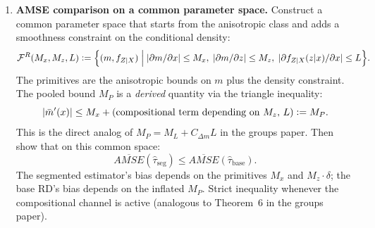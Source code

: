 \begin{itemize}
\begin{enumerate}
\begin{equation*}
			\min_{\hat\tau \in \mathcal{L}} \sup_{f \in \mathcal{F}_{\mathrm{aniso}}(M, M)} \mathrm{MSE}(\hat\tau, f) < \min_{\hat\tau \in \mathcal{L}} \sup_{f \in \mathcal{F}_{\mathrm{iso}}(M\sqrt{2})} \mathrm{MSE}(\hat\tau, f).
		\end{equation*}
		The weak inequality is mechanical from $\mathcal{F}_{\mathrm{aniso}}(M,M) \subset \mathcal{F}_{\mathrm{iso}}(M\sqrt{2})$.
		Strict inequality holds because the anisotropic class has directional structure that the minimax estimator can exploit (segmentation), while the isotropic minimax estimator cannot benefit from segmentation (fungibility).
		This establishes that the anisotropic class, which is more appropriate for covariate adjustment, yields a better minimax estimator.
		\item \textbf{AMSE comparison on a common parameter space.}
		Construct a common parameter space that starts from the anisotropic class and adds a smoothness constraint on the conditional density:
		\begin{equation*}
			\mathcal{F}^R(M_x, M_z, L) \vcentcolon= \Bigl\{ (m, f_{Z|X}) \;\Big|\; \lvert\partial m / \partial x\rvert \leq M_x,\; \lvert\partial m / \partial z\rvert \leq M_z,\; \lvert\partial f_{Z|X}(z|x) / \partial x\rvert \leq L \Bigr\}.
		\end{equation*}
		The primitives are the anisotropic bounds on $m$ plus the density constraint.
		The pooled bound $M_P$ is a \emph{derived} quantity via the triangle inequality:
		\begin{equation*}
			\lvert\bar{m}'(x)\rvert \leq M_x + \text{(compositional term depending on $M_z$, $L$)} \vcentcolon= M_P.
		\end{equation*}
		This is the direct analog of $M_P = M_L + C_{\Delta m} L$ in the groups paper.
		Then show that on this common space:
		\begin{equation*}
			\overline{AMSE}(\hat\tau_{\mathrm{seg}}) \leq \overline{AMSE}(\hat\tau_{\mathrm{base}}).
		\end{equation*}
		The segmented estimator's bias depends on the primitives $M_x$ and $M_z \cdot \delta$; the base RD's bias depends on the inflated $M_P$.
		Strict inequality whenever the compositional channel is active (analogous to Theorem~6 in the groups paper).
	\end{enumerate}
\end{itemize}